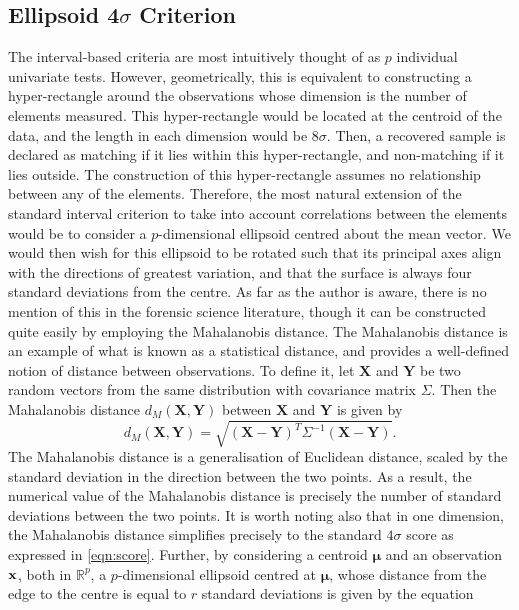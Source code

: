 \documentclass[a4paper]{article}
\newcommand{\R}{\mathbb{R}}
\newcommand{\bs}[1]{\boldsymbol{#1}}
\begin{document}
\subsection{Ellipsoid 4$\sigma$ Criterion}

The interval-based criteria are most intuitively thought of as $p$ individual univariate tests. However, geometrically, this is equivalent to constructing a hyper-rectangle around the observations whose dimension is the number of elements measured. This hyper-rectangle would be located at the centroid of the data, and the length in each dimension would be $8\sigma$. Then, a recovered sample is declared as matching if it lies within this hyper-rectangle, and non-matching if it lies outside. The construction of this hyper-rectangle assumes no relationship between any of the elements. Therefore, the most natural extension of the standard interval criterion to take into account correlations between the elements would be to consider a $p$-dimensional ellipsoid centred about the mean vector. We would then wish for this ellipsoid to be rotated such that its principal axes align with the directions of greatest variation, and that the surface is always four standard deviations from the centre. As far as the author is aware, there is no mention of this in the forensic science literature, though it can be constructed quite easily by employing the Mahalanobis distance. The Mahalanobis distance is an example of what is known as a statistical distance, and provides a well-defined notion of distance between observations. To define it, let $\bs{X}$ and $\bs{Y}$ be two random vectors from the same distribution with covariance matrix $\Sigma$. Then the Mahalanobis distance $d_M(\bs{X},\bs{Y})$ between $\bs{X}$ and $\bs{Y}$ is given by 
\begin{equation*}
    d_M(\bs{X},\bs{Y}) = \sqrt{(\bs{X}-\bs{Y})^T \Sigma^{-1} (\bs{X}-\bs{Y})}.
\end{equation*}
The Mahalanobis distance is a generalisation of Euclidean distance, scaled by the standard deviation in the direction between the two points. As a result, the numerical value of the Mahalanobis distance is precisely the number of standard deviations between the two points. It is worth noting also that in one dimension, the Mahalanobis distance simplifies precisely to the standard $4\sigma$ score as expressed in \cref{eqn:score}. Further, by considering a centroid $\bs{\mu}$ and an observation $\bf{x}$, both in $\R^p$, a $p$-dimensional ellipsoid centred at $\bs{\mu}$, whose distance from the edge to the centre is equal to $r$ standard deviations is given by the equation
\end{document}
